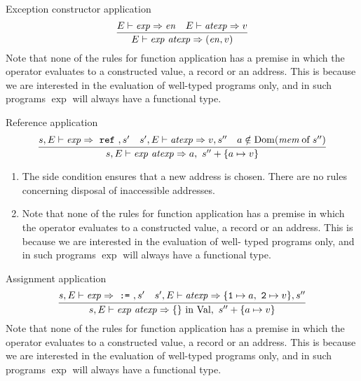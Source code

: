 \begin{inference-rule}{Exception constructor application}
\begin{equation}\label{rule:dynamic-core:exception-constructor-application}
\vcenter{\infer{\E\ts\appexp\ra(\e,\V)}
  {\E\ts\exp\ra\e
    & \E\ts\atexp\ra\V}}
\end{equation}
Note that none of the rules for function application has a premise
in which the operator evaluates to a constructed value, a record or an
address. This is because we are interested in the evaluation of
well-typed programs only, and in such programs $\exp$ will always have a
functional type.
\end{inference-rule}

\begin{inference-rule}{Reference application}
\begin{equation}\label{rule:dynamic-core:refapp}
\vcenter{\infer{\s,\E\ts\appexp\ra\A,\ \s''+\{\A\mapsto\V\} }
  {\s,\E\ts\exp\ra~\ml{ref}~,\s'
    & \s',\E\ts\atexp\ra\V,\s''
    & \A\notin\Dom(\of{\mem}{\s''})}}
\end{equation}
\begin{enumerate}
\item The side condition ensures that a new address is chosen. There are no
  rules concerning disposal of inaccessible addresses.
\item Note that none of the rules for function application has a premise
in which the operator evaluates to a constructed value, a record or an
address. This is because we are interested in the evaluation of well-
typed programs only, and in such programs $\exp$ will always have a
functional type.
\end{enumerate}
\end{inference-rule}

\begin{inference-rule}{Assignment application}
\begin{equation}\label{rule:dynamic-core:assapp}
\vcenter{\infer{\s,\E\ts\appexp\ra\emptymap\ \In\ \Val,\ \s''+\{\A\mapsto\V\}}
  {\s,\E\ts\exp\ra~\mbox{\tt :=}~,\s'
    & \s',\E\ts\atexp\ra\{{\tt 1}\mapsto\A,\ {\tt 2}\mapsto\V\},\s''}}
\end{equation}
Note that none of the rules for function application has a premise
in which the operator evaluates to a constructed value, a record or an
address. This is because we are interested in the evaluation of
well-typed programs only, and in such programs $\exp$ will always have a
functional type.
\end{inference-rule}

